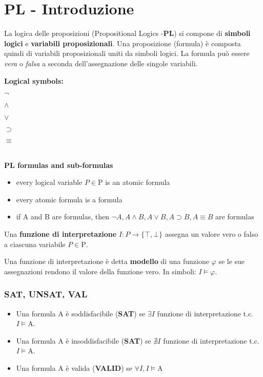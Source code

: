\chapter{PL - Introduzione}
La logica delle proposizioni (Propositional Logics -\textbf{PL}) si compone di \textbf{simboli logici} e \textbf{variabili proposizionali}. Una proposizione (formula) è composta quindi di variabili proposizionali uniti da simboli logici. La formula può essere \textit{vera} o \textit{falsa} a seconda dell'assegnazione delle singole variabili.

\begin{fdefinition}
\textbf{Logical symbols:}
\begin{enumerate*}[label=(\arabic*)]
\item $\lnot$
\item $\land$
\item $\lor$
\item $\supset$
\item $\equiv$
\end{enumerate*}
\\
\textbf{PL formulas and sub-formulas}
\begin{itemize}
\item every logical variable $P \in \mathrm{P}$ is an atomic formula
\item every atomic formula is a formula
\item if A and B are formulas, then $\lnot A, A \land B, A \lor B, A \supset B, A \equiv B$ are formulas
\end{itemize}
\end{fdefinition}

Una \textbf{funzione di interpretazione} $I: \mathit{P} \to \lbrace \top, \bot \rbrace$ assegna un valore vero o falso a ciascuna variabile $P \in \mathrm{P}$.

Una funzione di interpretazione è detta \textbf{modello} di una funzione $\varphi$ se le sue assegnazioni rendono il valore della funzione vero. In simboli: $I \models \varphi$.

\subsection{SAT, UNSAT, VAL}

\begin{itemize}
\item Una formula $\mathrm{A}$ è soddisfacibile (\textbf{SAT}) se $\exists I$ funzione di interpretazione t.c. $I \models \mathrm{A}$.

\item Una formula $\mathrm{A}$ è insoddisfacibile (\textbf{SAT}) se $\nexists I$ funzione di interpretazione t.c. $I \models \mathrm{A}$.

\item Una formula $\mathrm{A}$ è valida (\textbf{VALID}) se $\forall I, I \models \mathrm{A}$
\end{itemize}

